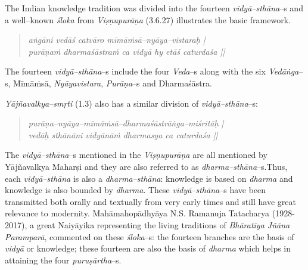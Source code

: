 The Indian knowledge tradition was divided into the fourteen \textit{vidyā–sthāna}–s and a well–known \textit{śloka} from \textit{Viṣṇupurāṇa} (3.6.27) illustrates the basic framework.

\begin{verse}
\textit{aṅgāni vedāś catvāro mīmāṁsā–nyāya–vistaraḥ | }\\\textit{purāṇaṁ dharmaśāstraṁ ca vidyā hy etāś caturdaśa ||}
\end{verse}

The fourteen \textit{vidyā–sthāna}–s include the four \textit{Veda}–s along with the six \textit{Vedāṅga}–s, Mīmāṁsā, \textit{Nyāyavistara}, \textit{Purāṇa}–s and Dharmaśāstra.

\newpage

\textit{Yājñavalkya–smṛti} (1.3) also has a similar division of \textit{vidyā–sthāna}–s:

\begin{verse}
\textit{purāṇa–nyāya–mīmāṁsā–dharmaśāstrāṅga–miśritāḥ |}\\\textit{vedāḥ sthānāni vidyānāṁ dharmasya ca caturdaśa ||}
\end{verse}

The \textit{vidyā–sthāna}–s mentioned in the \textit{Viṣṇupurāṇa} are all mentioned by Yājñavalkya Maharṣi and they are also referred to as \textit{dharma–sthāna}–s.\break Thus, each \textit{vidyā–sthāna} is also a \textit{dharma–sthāna}: knowledge is based on \textit{dharma} and knowledge is also bounded by \textit{dharma}. These \textit{vidyā–sthāna}–s have been transmitted both orally and textually from very early times and still have great relevance to modernity. Mahāmahopādhyāya N.S. Ramanuja Tatacharya (1928-2017), a great Naiyāyika representing the living traditions of \textit{Bhāratīya Jñāna Paramparā}, commented on these \textit{śloka}–s: the fourteen branches are the basis of\textit{ vidyā }or knowledge; these fourteen are also the basis of \textit{dharma }which helps in attaining the four \textit{puruṣārtha}–s.

